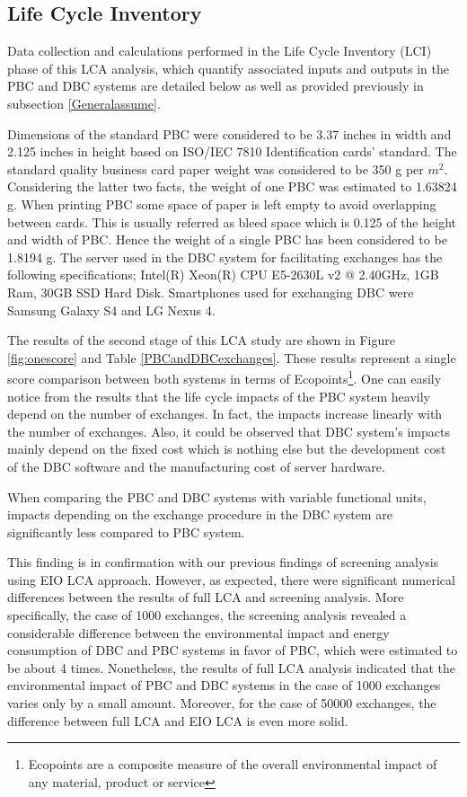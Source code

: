 \documentclass[conference]{IEEEtran}
\begin{document}
\subsection{Life Cycle Inventory}
Data collection and calculations performed in the Life Cycle Inventory (LCI) phase of this LCA analysis, which quantify associated inputs and outputs in the PBC and DBC systems are detailed below as well as provided previously in subsection \ref{Generalassume}. 

Dimensions of the standard PBC were considered to be 3.37 inches in width and 2.125 inches in height based on ISO/IEC 7810 Identification cards' standard.  The standard quality business card paper weight was considered to be 350 g per $m^2$. Considering the latter two facts, the weight of one PBC was estimated to 1.63824 g. When printing PBC some space of paper is left empty to avoid overlapping between cards. This is usually referred as bleed space which is 0.125 of the height and width of PBC. Hence the weight of a single PBC has been considered to be 1.8194 g. The server used in the DBC system for facilitating exchanges has the following specifications; Intel(R) Xeon(R) CPU E5-2630L v2 @ 2.40GHz, 1GB Ram, 30GB SSD Hard Disk. Smartphones used for exchanging DBC were Samsung Galaxy S4 and LG Nexus 4.

The results of the second stage of this LCA study are shown in Figure \ref{fig:onescore} and Table \ref{PBCandDBCexchanges}. These results represent a single score comparison between both systems in terms of Ecopoints\footnote{Ecopoints are a composite measure of the overall environmental impact of any material, product or service}. One can easily notice from the results that the life cycle impacts of the PBC system heavily depend on the number of exchanges. In fact, the impacts increase linearly with the number of exchanges. Also, it could be observed that DBC system's impacts mainly depend on the fixed cost which is nothing else but the development cost of the DBC software and the manufacturing cost of server hardware. 

When comparing the PBC and DBC systems with variable functional units, impacts depending on the exchange procedure in the DBC system are significantly less compared to PBC system.  

This finding is in confirmation with our previous findings of screening analysis using EIO LCA approach. However, as expected, there were significant numerical differences between the results of full LCA and screening analysis. More specifically, the case of 1000 exchanges, the screening analysis revealed a considerable difference between the environmental impact and energy consumption of DBC and PBC systems in favor of PBC, which were estimated to be about 4 times. Nonetheless, the results of full LCA analysis indicated that the environmental impact of PBC and DBC systems in the case of 1000 exchanges varies only by a small amount. Moreover, for the case of 50000 exchanges, the difference between full LCA and EIO LCA is even more solid.
\end{document}
